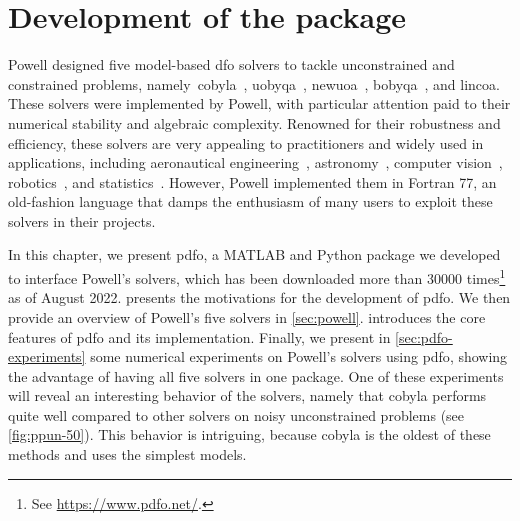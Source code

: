 %
%
%
\chapter{Development of the  package}
\label{ch:pdfo}

Powell designed five model-based \gls{dfo} solvers to tackle unconstrained and constrained problems, namely~\gls{cobyla}~\cite{Powell_1994}, \gls{uobyqa}~\cite{Powell_2002}, \gls{newuoa}~\cite{Powell_2006}, \gls{bobyqa}~\cite{Powell_2009}, and \gls{lincoa}.
These solvers were implemented by Powell, with particular attention paid to their numerical stability and algebraic complexity.
Renowned for their robustness and efficiency, these solvers are very appealing to practitioners and widely used in applications, including aeronautical engineering~\cite{Gallard_Etal_2018}, astronomy~\cite{Biviano_Etal_2013,Mamon_Biviano_Boue_2013}, computer vision~\cite{Izadinia_Shan_Seitz_2017}, robotics~\cite{Mombaur_Truong_Laumond_2010}, and statistics~\cite{Bates_Etal_2015}.
However, Powell implemented them in Fortran 77, an old-fashion language that damps the enthusiasm of many users to exploit these solvers in their projects.

In this chapter, we present \gls{pdfo}, a MATLAB and Python package we developed to interface Powell's solvers, which has been downloaded more than \num{30000} times\footnote{See \url{https://www.pdfo.net/}.} as of August 2022.
 presents the motivations for the development of \gls{pdfo}.
We then provide an overview of Powell's five solvers in \cref{sec:powell}.
 introduces the core features of \gls{pdfo} and its implementation.
Finally, we present in \cref{sec:pdfo-experiments} some numerical experiments on Powell's solvers using \gls{pdfo}, showing the advantage of having all five solvers in one package.
One of these experiments will reveal an interesting behavior of the solvers, namely that \gls{cobyla} performs quite well compared to other solvers on noisy unconstrained problems (see \cref{fig:ppun-50}).
This behavior is intriguing, because \gls{cobyla} is the oldest of these methods and uses the simplest models.

